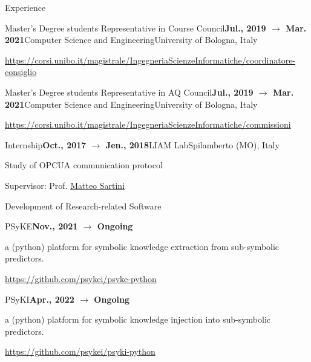 \documentclass{resume} %
\begin{document}
\begin{rSection}{Experience}
        \begin{rSubsection}{Master's Degree students Representative in Course Council}{\textbf{Jul., 2019 $\rightarrow$ Mar. 2021}}{Computer Science and Engineering}{University of Bologna, Italy}
            \item \url{https://corsi.unibo.it/magistrale/IngegneriaScienzeInformatiche/coordinatore-consiglio}
        \end{rSubsection}
        
        \begin{rSubsection}{Master's Degree students Representative in AQ Council}{\textbf{Jul., 2019 $\rightarrow$ Mar. 2021}}{Computer Science and Engineering}{University of Bologna, Italy}
            \item \url{https://corsi.unibo.it/magistrale/IngegneriaScienzeInformatiche/commissioni}
        \end{rSubsection}
        
        \begin{rSubsection}{Internship}{\textbf{Oct., 2017 $\rightarrow$ Jen., 2018}}{LIAM Lab}{Spilamberto (MO), Italy}
            \item Study of OPCUA communication protocol
            \item Supervisor: Prof. \href{mailto:matteo.sartini@unibo.it}{Matteo Sartini} 
        \end{rSubsection}
        
    \end{rSection}
    
    \begin{rSection}{Development of Research-related Software}
        
        \begin{rSubsection}{PSyKE}{\textbf{Nov., 2021 $\rightarrow$ Ongoing}}{}{}
            \item a (python) platform for symbolic knowledge extraction from sub-symbolic predictors.
            \item \url{https://github.com/psykei/psyke-python}
        \end{rSubsection}
    
    \begin{rSubsection}{PSyKI}{\textbf{Apr., 2022 $\rightarrow$ Ongoing}}{}{}
        \item a (python) platform for symbolic knowledge injection into sub-symbolic predictors.
        \item \url{https://github.com/psykei/psyki-python}
    \end{rSubsection}
        
    \end{rSection}
    
\end{document}
